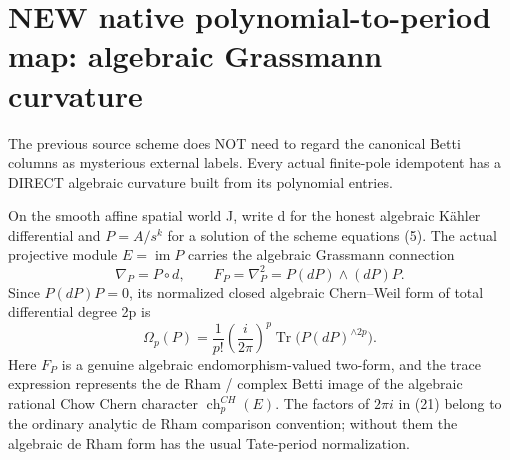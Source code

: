 \documentclass[11pt]{article}
\begin{document}
\section{NEW native polynomial-to-period map: algebraic Grassmann curvature}
The previous source scheme does NOT
need to regard the canonical Betti
columns as mysterious external labels.
Every actual finite-pole idempotent
has a DIRECT algebraic curvature
built from its polynomial entries.

On the smooth affine spatial world J,
write d for the honest algebraic
Kähler differential and
$P=A/s^k$ for a solution of
the scheme equations (5).
The actual projective module
$E=\operatorname{im}P$ carries
the algebraic Grassmann connection
\[
 \boxed{
 \nabla_P=P\circ d,\qquad
 F_P=\nabla_P^2
       =P(dP)\wedge(dP)P.
 }                                                     \tag{20}
\]
Since $P(dP)P=0$, its normalized
closed algebraic Chern--Weil
form of total differential degree
2p is
\[
 \boxed{
 \Omega_p(P)=\frac1{p!}
     \left(\frac{i}{2\pi}\right)^p
       \operatorname{Tr}
        \big(P(dP)^{\wedge 2p}\big).
 }                                                     \tag{21}
\]
Here $F_P$ is a genuine
algebraic endomorphism-valued
two-form, and the trace
expression represents the
de Rham / complex Betti image
of the algebraic rational Chow
Chern character $\operatorname{ch}_p^{CH}(E)$.
The factors of $2\pi i$
in (21) belong to the
ordinary analytic de Rham
comparison convention;
without them the algebraic
de Rham form has the usual
Tate-period normalization.
\end{document}
